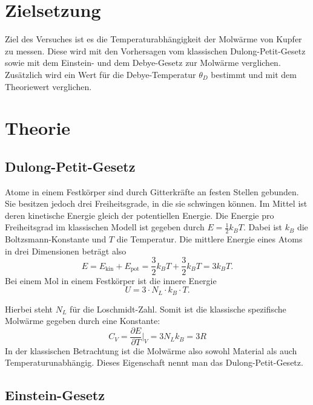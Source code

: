 \section{Zielsetzung}
\label{sec:Zielsetzung}

Ziel des Versuches ist es die Temperaturabhängigkeit der Molwärme von Kupfer zu messen. Diese wird mit den Vorhersagen 
vom klassischen Dulong-Petit-Gesetz sowie mit dem Einstein- und dem Debye-Gesetz zur Molwärme verglichen. Zusätzlich wird ein Wert für die Debye-Temperatur $\theta_D$ bestimmt und mit dem Theoriewert verglichen.


\section{Theorie}
\label{sec:Theorie}

\subsection{Dulong-Petit-Gesetz}
\label{sec:dulongpetit}

Atome in einem Festkörper sind durch Gitterkräfte an festen Stellen gebunden. Sie besitzen jedoch drei Freiheitsgrade, in die sie schwingen können. 
Im Mittel ist deren kinetische Energie gleich der potentiellen Energie. Die Energie pro Freiheitsgrad im klassischen Modell ist gegeben durch 
$E = \frac{1}{2}k_B T$. Dabei ist $k_B$ die Boltzsmann-Konstante und $T$ die Temperatur. Die mittlere Energie eines Atoms in drei Dimensionen beträgt also 
\begin{equation}
    E = E_{\text{kin}} + E_{\text{pot}} = \frac{3}{2}k_B T + \frac{3}{2}k_B T = 3k_B T.
\end{equation}
Bei einem Mol in einem Festkörper ist die innere Energie 
\begin{equation}
    U = 3 \cdot N_L\cdot k_B \cdot T.
\end{equation}

Hierbei steht $N_L$ für die Loschmidt-Zahl. Somit ist die klassische spezifische Molwärme gegeben durch eine Konstante:
\begin{equation}
    C_V = \frac{\partial E}{\partial T} \bigg\vert_V = 3 N_L k_B = 3 R
\end{equation}
In der klassischen Betrachtung ist die Molwärme also sowohl Material als auch Temperaturunabhängig. Dieses Eigenschaft nennt man das Dulong-Petit-Gesetz.
\subsection{Einstein-Gesetz}
\label{sec:einstein}

